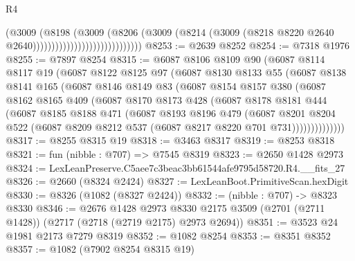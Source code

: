 \begin{lexlean}{R4}
\begin{coremodule}
                                              (@3009
                                                (@8198
                                                  (@3009
                                                    (@8206
                                                      (@3009
                                                        (@8214
                                                          (@3009
                                                            (@8218
                                                              @8220
                                                              @2640
                                                              @2640)))))))))))))))))))))))))))))
@8253 := @2639 @8252
@8254 := @7318 @1976
@8255 := @7897 @8254
@8315 := @6087
    @8106
    @8109
    @90
    (@6087
      @8114
      @8117
      @19
      (@6087
        @8122
        @8125
        @97
        (@6087
          @8130
          @8133
          @55
          (@6087
            @8138
            @8141
            @165
            (@6087
              @8146
              @8149
              @83
              (@6087
                @8154
                @8157
                @380
                (@6087
                  @8162
                  @8165
                  @409
                  (@6087
                    @8170
                    @8173
                    @428
                    (@6087
                      @8178
                      @8181
                      @444
                      (@6087
                        @8185
                        @8188
                        @471
                        (@6087
                          @8193
                          @8196
                          @479
                          (@6087
                            @8201
                            @8204
                            @522
                            (@6087 @8209 @8212 @537 (@6087 @8217 @8220 @701 @731))))))))))))))
@8317 := @8255 @8315 @19
@8318 := @3463 @8317
@8319 := @8253 @8318
@8321 := fun (nibble : @707) => @7545 @8319
@8323 := @2650 @1428 @2973
@8324 := LexLeanPreserve.C5aee7c3beac3bb61544afe9795d58720.R4.__fits_27
@8326 := @2660 (@8324 @2424)
@8327 := LexLeanBoot.PrimitiveScan.hexDigit
@8330 := @8326 (@1082 (@8327 @2424))
@8332 := (nibble : @707) -> @8323 @8330
@8346 := @2676
    @1428
    @2973
    @8330
    @2175
    @3509
    (@2701 (@2711 @1428))
    (@2717 (@2718 (@2719 @2175) @2973 @2694))
@8351 := @3523 @24 @1981 @2173 @7279 @8319
@8352 := @1082 @8254
@8353 := @8351 @8352
@8357 := @1082 (@7902 @8254 @8315 @19)

\end{coremodule}
\end{lexlean}
